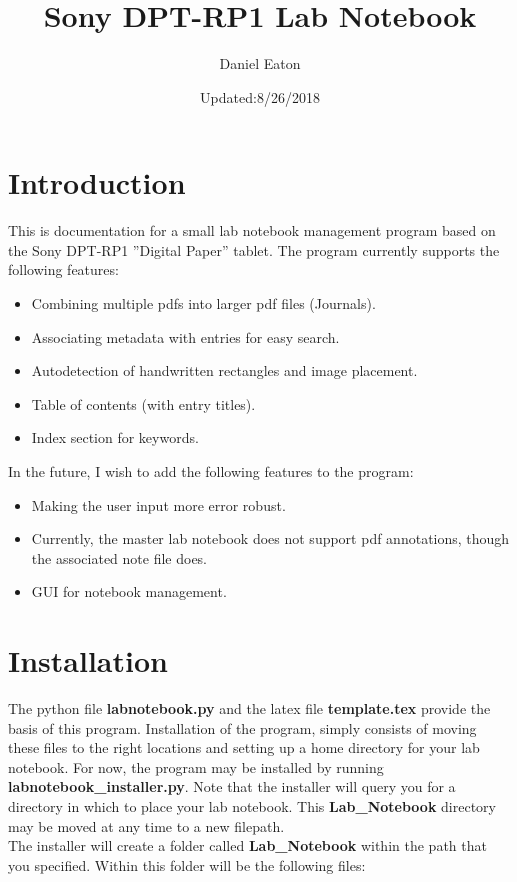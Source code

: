\documentclass{article}
\title{Sony DPT-RP1 Lab Notebook}
\author{Daniel Eaton}
\date{Updated:8/26/2018}
\begin{document}
\maketitle

\section{Introduction}

This is documentation for a small lab notebook management program based on the Sony DPT-RP1 ''Digital Paper'' tablet. The program currently supports the following features:
\begin{itemize}
    \item Combining multiple pdfs into larger pdf files (Journals).
    \item Associating metadata with entries for easy search.
    \item Autodetection of handwritten rectangles and image placement.
    \item Table of contents (with entry titles).
    \item Index section for keywords.
\end{itemize}

\noindent In the future, I wish to add the following features to the program:
\begin{itemize}
    \item Making the user input more error robust.
    \item Currently, the master lab notebook does not support pdf annotations, though the associated note file does.
    \item GUI for notebook management.
\end{itemize}

\section{Installation}
The python file \textbf{labnotebook.py} and the latex file \textbf{template.tex} provide the basis of this program. Installation of the program, simply consists of moving these files to the right locations and setting up a home directory for your lab notebook. For now, the program may be installed by running \textbf{labnotebook\_installer.py}. Note that the installer will query you for a directory in which to place your lab notebook. This \textbf{Lab\_Notebook} directory may be moved at any time to a new filepath.\\

The installer will create a folder called \textbf{Lab\_Notebook} within the path that you specified. Within this folder will be the following files:\\
\end{document}
